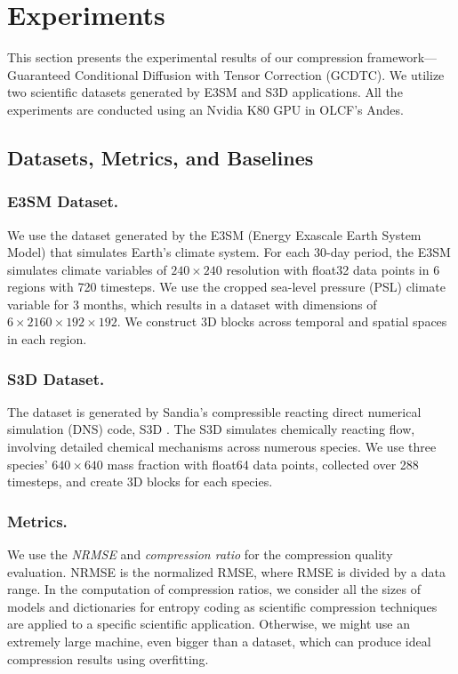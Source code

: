 \section{Experiments}
This section presents the experimental results of our compression framework---Guaranteed Conditional Diffusion with Tensor Correction (GCDTC). We utilize two scientific datasets generated by E3SM and S3D applications. All the experiments are conducted using an Nvidia K80 GPU in OLCF's Andes.

\subsection{Datasets, Metrics, and Baselines}

\subsubsection{E3SM Dataset.}
We use the dataset generated by the E3SM (Energy Exascale Earth System Model) \cite{e3sm} that simulates Earth's climate system. For each 30-day period, the E3SM simulates climate variables of $240\times 240$ resolution with float32 data points in 6 regions with 720 timesteps. We use the cropped sea-level pressure (PSL) climate variable for 3 months, which results in a dataset with dimensions of $6\times 2160\times 192 \times 192$. We construct 3D blocks across temporal and spatial spaces in each region.
\vspace{-0.2cm}
\subsubsection{S3D Dataset.}
The dataset is generated by Sandia’s compressible reacting direct numerical simulation (DNS) code, S3D \cite{s3d}. The S3D simulates chemically reacting flow, involving detailed chemical mechanisms across numerous species. We use three species' $640\times 640$ mass fraction with float64 data points, collected over 288 timesteps, and create 3D blocks for each species.

\vspace{-0.2cm}
\subsubsection{Metrics.}
We use the \textit{NRMSE} and \textit{compression ratio} for the compression quality evaluation. NRMSE is the normalized RMSE, where RMSE is divided by a data range. In the computation of compression ratios, we consider all the sizes of models and dictionaries for entropy coding as scientific compression techniques are applied to a specific scientific application. Otherwise, we might use an extremely large machine, even bigger than a dataset, which can produce ideal compression results using overfitting.

